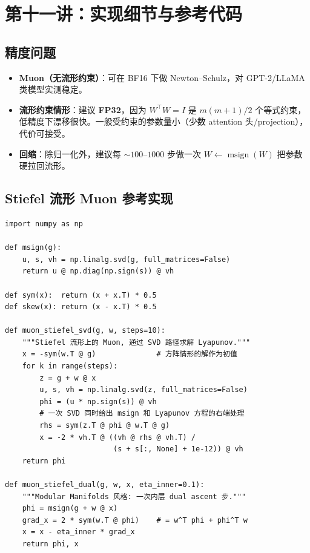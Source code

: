 \documentclass[11pt,a4paper]{article}
\theoremstyle{mythm}
\theoremstyle{mydef}
\newcommand{\msign}{\operatorname{msign}}
\begin{document}
\section{第十一讲：实现细节与参考代码}\label{sec:code}

\subsection{精度问题}
\begin{itemize}[leftmargin=2em]
\item \textbf{Muon（无流形约束）}：可在 BF16 下做 Newton--Schulz，对 GPT-2/LLaMA 类模型实测稳定。
\item \textbf{流形约束情形}：建议 \textbf{FP32}，因为 $W^\top W = I$ 是 $m(m+1)/2$ 个等式约束，低精度下漂移很快。一般受约束的参数量小（少数 attention 头/projection），代价可接受。
\item \textbf{回缩}：除归一化外，建议每 $\sim 100$--$1000$ 步做一次 $W \leftarrow \msign(W)$ 把参数硬拉回流形。
\end{itemize}

\subsection{Stiefel 流形 Muon 参考实现}

\begin{lstlisting}
import numpy as np

def msign(g):
    u, s, vh = np.linalg.svd(g, full_matrices=False)
    return u @ np.diag(np.sign(s)) @ vh

def sym(x):  return (x + x.T) * 0.5
def skew(x): return (x - x.T) * 0.5

def muon_stiefel_svd(g, w, steps=10):
    """Stiefel 流形上的 Muon, 通过 SVD 路径求解 Lyapunov."""
    x = -sym(w.T @ g)              # 方阵情形的解作为初值
    for k in range(steps):
        z = g + w @ x
        u, s, vh = np.linalg.svd(z, full_matrices=False)
        phi = (u * np.sign(s)) @ vh
        # 一次 SVD 同时给出 msign 和 Lyapunov 方程的右端处理
        rhs = sym(z.T @ phi @ w.T @ g)
        x = -2 * vh.T @ ((vh @ rhs @ vh.T) /
                         (s + s[:, None] + 1e-12)) @ vh
    return phi

def muon_stiefel_dual(g, w, x, eta_inner=0.1):
    """Modular Manifolds 风格: 一次内层 dual ascent 步."""
    phi = msign(g + w @ x)
    grad_x = 2 * sym(w.T @ phi)    # = w^T phi + phi^T w
    x = x - eta_inner * grad_x
    return phi, x
\end{lstlisting}
\end{document}
